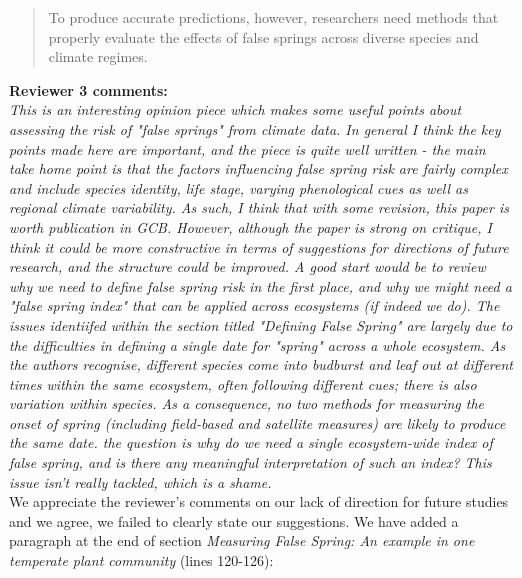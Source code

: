 \documentclass[11pt,a4paper]{article}
\begin{document}
\begin{quotation}
To produce accurate predictions, however, researchers need methods that properly evaluate the effects of false springs across diverse species and climate regimes. 
\end{quotation} 

\textbf{ Reviewer 3 comments:} \\

\textit{This is an interesting opinion piece which makes some useful points about assessing the risk of "false springs" from climate data.  In general I think the key points made here are important, and the piece is quite well written - the main take home point is that the factors influencing false spring risk are fairly complex and include species identity, life stage, varying phenological cues as well as regional climate variability.  As such, I think that with some revision, this paper is worth publication in GCB. However, although the paper is strong on critique, I think it could be more constructive in terms of suggestions for directions of future research, and the structure could be improved.  A good start would be to review why we need to define false spring risk in the first place, and why we might need a "false spring index" that can be applied across ecosystems (if indeed we do).  The issues identiifed within the section titled "Defining False Spring" are largely due to the difficulties in defining a single date for "spring" across a whole ecosystem.  As the authors recognise, different species come into budburst and leaf out at different times within the same ecosystem, often following different cues; there is also variation within species.  As a consequence, no two methods for measuring the onset of spring (including field-based and satellite measures) are likely to produce the same date.  the question is why do we need a single ecosystem-wide index of false spring, and is there any meaningful interpretation of such an index?  This issue isn't really tackled, which is a shame. } \\

We appreciate the reviewer's comments on our lack of direction for future studies and we agree, we failed to clearly state our suggestions. We have added a paragraph at the end of section \textit{Measuring False Spring: An example in one temperate plant community} (lines 120-126): \\ %
\end{document}
